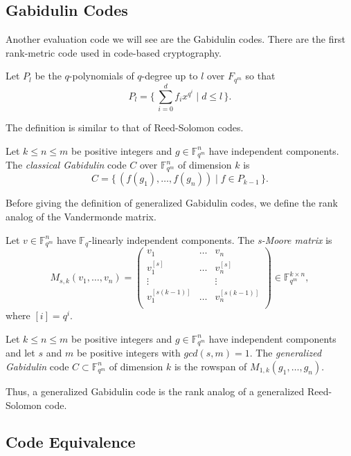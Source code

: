 \subsection{Gabidulin Codes}
Another evaluation code we will see are the Gabidulin codes. There are the first rank-metric code used in code-based cryptography.

Let $P_l$ be the $q$-polynomials of $q$-degree up to $l$ over $F_{q^m}$ so that
\[
P_l = \{\, \sum_{i=0}^df_ix^{q^i} \mid d \leq l \,\}.
\]

The definition is similar to that of Reed-Solomon codes.

\begin{definition}
Let $k \leq n \leq m$ be positive integers and $g \in \mathbb{F}_{q^m}^n$ have independent components. The \textit{classical Gabidulin} code $C$ over $\mathbb{F}_{q^m}^n$ of dimension $k$ is
\[
C = 
\{\, (f(g_1), \dots, f(g_n)) \mid f \in P_{k-1} \, \}.
\]
\end{definition}
Before giving the definition of generalized Gabidulin codes, we define the rank analog of the Vandermonde matrix.

\begin{definition}
Let $v \in \mathbb{F}_{q^m}^n$ have $\mathbb{F}_q$-linearly independent components. The \textit{s-Moore matrix} is
\[
M_{s, k}(v_1, \dots, v_n) = 
\begin{pmatrix}
    v_1 &\dots& v_n \\
    v_1^{[s]} &\dots& v_n^{[s]} \\
    \vdots && \vdots \\
    v_1^{[s(k-1)]} &\dots& v_n^{[s(k-1)]} \\
\end{pmatrix} \in \mathbb{F}_{q^m}^{k \times n},
\]
where $[i] = q^i$.
\end{definition}

\begin{definition}
Let $k \leq n \leq m$ be positive integers and $g \in \mathbb{F}_{q^m}^n$ have independent components and let $s$ and $m$  be positive integers with $gcd(s, m) = 1$. The \textit{generalized Gabidulin} code $C \subset \mathbb{F}_{q^m}^n$ of dimension $k$ is the rowspan of $M_{1, k}(g_1, \dots, g_n)$.    
\end{definition}

Thus, a generalized Gabidulin code is the rank analog of a generalized Reed-Solomon code.

\subsection{Code Equivalence}

